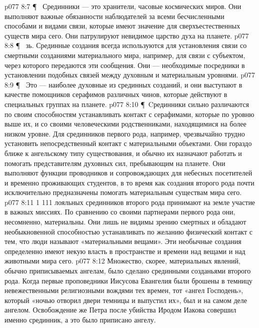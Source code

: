 \vs p077 8:7 \P\ \bibnobreakspace {} Срединники --- это хранители, часовые космических миров. Они выполняют важные обязанности наблюдателей за всеми бесчисленными способами и видами связи, которые имеют значение для сверхъестественных существ мира сего. Они патрулируют невидимое царство духа на планете.
\vs p077 8:8 \P\ \bibnobreakspace {} зь. Срединные создания всегда используются для установления связи со смертными созданиями материального мира, например, для связи с субъектом, через которого передаются эти сообщения. Они --- необходимые посредники в установлении подобных связей между духовным и материальным уровнями.
\vs p077 8:9 \P\ \bibnobreakspace {} Это --- наиболее духовные из срединных созданий, и они выступают в качестве помощников серафимов различных чинов, которые действуют в специальных группах на планете.
\vs p077 8:10 \P\ Cрединники сильно различаются по своим способностям устанавливать контакт с серафимами, которые по уровню выше их, и со своими человеческими родственниками, находящимися на более низком уровне. Для срединников первого рода, например, чрезвычайно трудно установить непосредственный контакт с материальными объектами. Они гораздо ближе к ангельскому типу существования, и обычно их назначают работать и помогать представителям духовных сил, пребывающим на планете. Они выполняют функции проводников и сопровождающих для небесных посетителей и временно проживающих студентов, в то время как создания второго рода почти исключительно предназначены помогать материальным существам мира сего.
\vs p077 8:11 1 111 лояльных срединников второго рода принимают на земле участие в важных миссиях. По сравнению со своими партнерами первого рода они, несомненно, материальны. Они лишь не видимы зрению смертных и обладают необыкновенной способностью устанавливать по желанию физический контакт с тем, что люди называют «материальными вещами». Эти необычные создания определенно имеют некую власть в пространстве и времени над вещами и над животными мира сего.
\vs p077 8:12 Множество, скорее, материальных явлений, обычно приписываемых ангелам, было сделано срединными созданьями второго рода. Когда первые проповедники Иисусова Евангелия были брошены в темницу невежественными религиозными вождями тех времен, тот «ангел Господень», который «ночью отворил двери темницы и выпустил их», был и на самом деле ангелом. Освобождение же Петра после убийства Иродом Иакова совершил именно срединник, а это было приписано ангелу.
